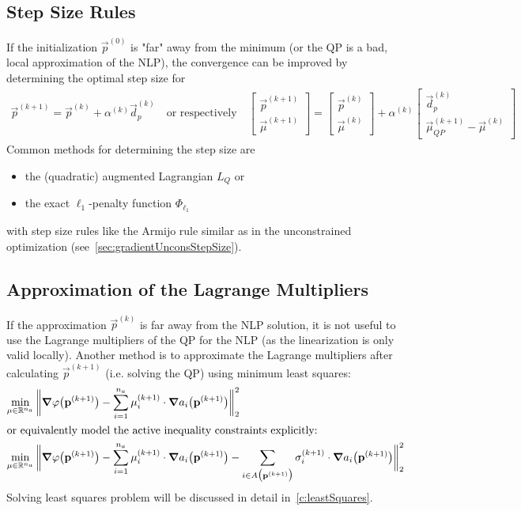 		\subsection{Step Size Rules}
			If the initialization \(\vec{p}^{(0)}\) is "far" away from the minimum (or the QP is a bad, local approximation of the NLP), the convergence can be improved by determining the optimal step size for
			\begin{align*}
				\vec{p}^{(k + 1)} = \vec{p}^{(k)} + \alpha^{(k)} \vec{d}_p^{(k)}
				\quad\text{or respectively}\quad
				\begin{bmatrix}
					\vec{p}^{(k + 1)} \\
					\vec{\mu}^{(k + 1)}
				\end{bmatrix}
				=
				\begin{bmatrix}
					\vec{p}^{(k)} \\
					\vec{\mu}^{(k)}
				\end{bmatrix}
				+
				\alpha^{(k)}
				\begin{bmatrix}
					\vec{d}_p^{(k)} \\
					\vec{\mu}_{QP}^{(k + 1)} - \vec{\mu}^{(k)}
				\end{bmatrix}
			\end{align*}
			Common methods for determining the step size are
			\begin{itemize}
				\item the (quadratic) augmented Lagrangian \( L_Q \) or
				\item the exact \(\ell_1\)-penalty function \( \Phi_{\ell_1} \)
			\end{itemize}
			with step size rules like the Armijo rule similar as in the unconstrained optimization (see~\autoref{sec:gradientUnconsStepSize}).

		\subsection{Approximation of the Lagrange Multipliers}
			If the approximation \( \vec{p}^{(k)} \) is far away from the NLP solution, it is not useful to use the Lagrange multipliers of the QP for the NLP (as the linearization is only valid locally). Another method is to approximate the Lagrange multipliers after calculating \( \vec{p}^{(k + 1)} \) (i.e. solving the QP) using minimum least squares:
			\begin{align*}
				\min_{\mu \in \mathbb{R}^{n_a}} &\,
						\bigg\lVert
							\grad{\varphi}\big(\boldsymbol{\mathrm{p}}^{(k + 1)}\big)
							- \sum_{i = 1}^{n_a} \mu_i^{(k + 1)} \cdot \grad{a_i}\big(\boldsymbol{\mathrm{p}}^{(k + 1)}\big)
						\bigg\rVert_2^2 \\
				\intertext{or equivalently model the active inequality constraints explicitly:}
				\min_{\mu \in \mathbb{R}^{n_a}} &\,
						\bigg\lVert
							\grad{\varphi}\big(\boldsymbol{\mathrm{p}}^{(k + 1)}\big)
							- \sum_{i = 1}^{n_a} \mu_i^{(k + 1)} \cdot \grad{a_i}\big(\boldsymbol{\mathrm{p}}^{(k + 1)}\big)
							- \sum_{i \in A\big(\boldsymbol{\mathrm{p}}^{(k + 1)}\big)} \sigma_i^{(k + 1)} \cdot \grad{a_i}\big(\boldsymbol{\mathrm{p}}^{(k + 1)}\big)
						\bigg\rVert_2^2
			\end{align*}
			Solving least squares problem will be discussed in detail in~\autoref{c:leastSquares}.

